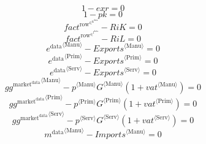\begin{equation}
1 - {e\!x\!r} = 0
\end{equation}
\begin{equation}
1 - {p\!k} = 0
\end{equation}
\begin{equation}
{f\!a\!c\!t}^{\mathrm{row}^{\in^{\mathrm{k}^{\mathrm{data}}}}} - {R\!i\!K} = 0
\end{equation}
\begin{equation}
{f\!a\!c\!t}^{\mathrm{row}^{\in^{\mathrm{l}^{\mathrm{data}}}}} - {R\!i\!L} = 0
\end{equation}
\begin{equation}
{e^{\mathrm{data}}}^{\langle \mathrm{\mathrm{Manu}}\rangle} - {{E\!x\!p\!o\!r\!t\!s}}^{\langle \mathrm{Manu}\rangle} = 0
\end{equation}
\begin{equation}
{e^{\mathrm{data}}}^{\langle \mathrm{\mathrm{Prim}}\rangle} - {{E\!x\!p\!o\!r\!t\!s}}^{\langle \mathrm{Prim}\rangle} = 0
\end{equation}
\begin{equation}
{e^{\mathrm{data}}}^{\langle \mathrm{\mathrm{Serv}}\rangle} - {{E\!x\!p\!o\!r\!t\!s}}^{\langle \mathrm{Serv}\rangle} = 0
\end{equation}
\begin{equation}
{{g\!g}^{\mathrm{market}^{\mathrm{data}}}}^{\langle \mathrm{\mathrm{Manu}}\rangle} - {{p}^{\langle \mathrm{Manu}\rangle}} {{G}^{\langle \mathrm{Manu}\rangle}} \left(1 + {{v\!a\!t}}^{\langle \mathrm{\mathrm{Manu}}\rangle}\right) = 0
\end{equation}
\begin{equation}
{{g\!g}^{\mathrm{market}^{\mathrm{data}}}}^{\langle \mathrm{\mathrm{Prim}}\rangle} - {{p}^{\langle \mathrm{Prim}\rangle}} {{G}^{\langle \mathrm{Prim}\rangle}} \left(1 + {{v\!a\!t}}^{\langle \mathrm{\mathrm{Prim}}\rangle}\right) = 0
\end{equation}
\begin{equation}
{{g\!g}^{\mathrm{market}^{\mathrm{data}}}}^{\langle \mathrm{\mathrm{Serv}}\rangle} - {{p}^{\langle \mathrm{Serv}\rangle}} {{G}^{\langle \mathrm{Serv}\rangle}} \left(1 + {{v\!a\!t}}^{\langle \mathrm{\mathrm{Serv}}\rangle}\right) = 0
\end{equation}
\begin{equation}
{m^{\mathrm{data}}}^{\langle \mathrm{\mathrm{Manu}}\rangle} - {{I\!m\!p\!o\!r\!t\!s}}^{\langle \mathrm{Manu}\rangle} = 0
\end{equation}
